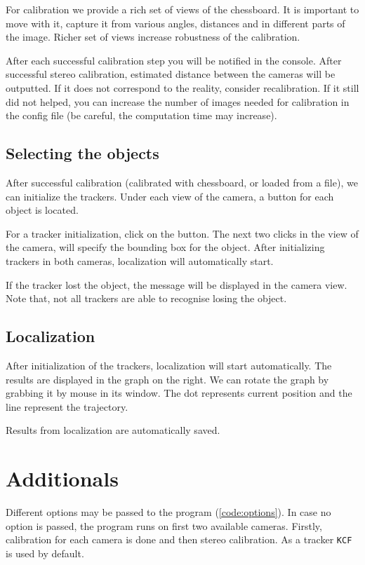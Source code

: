 For calibration we provide a rich set of views of the chessboard. It is important
to move with it, capture it from various angles, distances and in different
parts of the image. Richer set of views increase robustness of the calibration.

After each successful calibration step you will be notified in the console.
After successful stereo calibration, estimated distance between the cameras
will be outputted. If it does not correspond to the reality, consider
recalibration. If it still did not helped, you can increase the number of
images needed for calibration in the config file (be careful, the computation
time may increase).

\subsection{Selecting the objects}
After successful calibration (calibrated with chessboard, or loaded from a
file), we can initialize the trackers. Under each view of the camera, a button
for each object is located.

For a tracker initialization, click on the button. The next two clicks in the
view of the camera, will specify the bounding box for the object. After
initializing trackers in both cameras, localization will automatically start.

If the tracker lost the object, the message will be displayed in the camera
view. Note that, not all trackers are able to recognise losing the object.

\subsection{Localization}
After initialization of the trackers, localization will start automatically.
The results are displayed in the graph on the right. We can rotate the graph by
grabbing it by mouse in its window. The dot represents current position and the
line represent the trajectory.

Results from localization are automatically saved.

\section{Additionals}

Different options may be passed to the program (\ref{code:options}). In case no option
is passed, the program runs on first two available cameras. Firstly, calibration for
each camera is done and then stereo calibration. As a tracker \verb+KCF+ is used by default.

